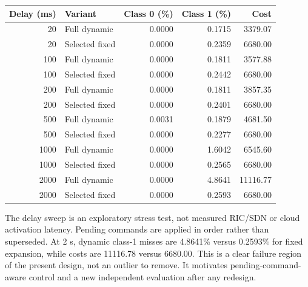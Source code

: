 \documentclass[10pt,a4paper]{article}
\begin{document}
\begin{center}\scriptsize
\begin{tabular}{rlrrr}\toprule
Delay (ms) & Variant & Class 0 (\%) & Class 1 (\%) & Cost\\\midrule
20 & Full dynamic & 0.0000 & 0.1715 & 3379.07 \\
20 & Selected fixed & 0.0000 & 0.2359 & 6680.00 \\
100 & Full dynamic & 0.0000 & 0.1811 & 3577.88 \\
100 & Selected fixed & 0.0000 & 0.2442 & 6680.00 \\
200 & Full dynamic & 0.0000 & 0.1811 & 3857.35 \\
200 & Selected fixed & 0.0000 & 0.2401 & 6680.00 \\
500 & Full dynamic & 0.0031 & 0.1879 & 4681.50 \\
500 & Selected fixed & 0.0000 & 0.2277 & 6680.00 \\
1000 & Full dynamic & 0.0000 & 1.6042 & 6545.60 \\
1000 & Selected fixed & 0.0000 & 0.2565 & 6680.00 \\
2000 & Full dynamic & 0.0000 & 4.8641 & 11116.77 \\
2000 & Selected fixed & 0.0000 & 0.2593 & 6680.00 \\
\bottomrule\end{tabular}\end{center}
The delay sweep is an exploratory stress test, not measured RIC/SDN or cloud
activation latency. Pending commands are applied in order rather than superseded.
At 2 s, dynamic class-1 misses are 4.8641\% versus 0.2593\% for fixed expansion,
while costs are 11116.78 versus 6680.00. This is a clear failure region of the
present design, not an outlier to remove. It motivates pending-command-aware
control and a new independent evaluation after any redesign.
\end{document}
